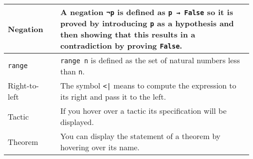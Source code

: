 \begin{tabular}{p{}|r|p{}}
Negation&\pageref{p.negation}&A negation \Verb+¬p+ is defined as \Verb+p → False+ so it is proved by introducing \Verb+p+ as a hypothesis and then showing that this results in a contradiction by proving \Verb+False+.\\\hline

\Verb+range+&\pageref{p.range}&\Verb+range n+ is defined as the set of natural numbers less than \Verb+n+.\\\hline

Right-to-left&\pageref{p.right-to-left}&The symbol \Verb+<|+ means to compute the expression to its right and pass it to the left.\\\hline

Tactic&\pageref{p.tactic}&If you hover over a tactic its specification will be displayed.\\\hline

Theorem&\pageref{p.theorem}&You can display the statement of a theorem by hovering over its name.\\\hline

\end{tabular}


